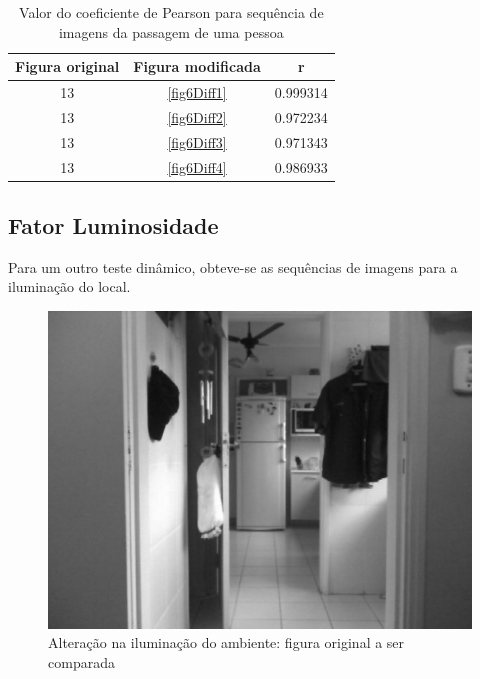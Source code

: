 \documentclass[10pt,a4paper]{article}
\begin{document}
\begin{table}[h!]
  \begin{center}
    \caption{Valor do coeficiente de Pearson para sequência de imagens
      da passagem de uma pessoa}
    \begin{tabular}{|c|c|c|}
      \hline
      Figura original & Figura modificada & r\\
      \hline
      13 &  \ref{fig6Diff1} & 0.999314\\
      13 &  \ref{fig6Diff2} & 0.972234\\
      13 &  \ref{fig6Diff3} & 0.971343\\
      13 &  \ref{fig6Diff4} & 0.986933\\
      \hline
    \end{tabular}
  \end{center}
\end{table}


\newpage
\subsection{Fator Luminosidade}
Para um outro teste dinâmico, obteve-se as sequências de imagens para
a iluminação do local.

\begin{figure}[h!]
  \begin{center}
    \includegraphics[scale=0.35]{photos/luzes/gBase}
    \caption{Alteração na iluminação do ambiente: figura original a ser comparada}
  \end{center}
  \label{luzes}
\end{figure}
\end{document}

